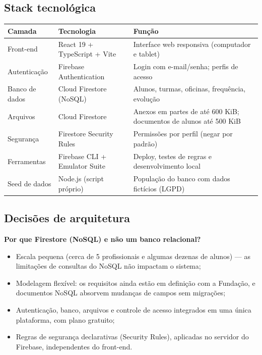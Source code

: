 \documentclass[a4paper,11pt]{article}
\begin{document}
\subsection{Stack tecnológica}

\begin{center}
\begin{tabularx}{\textwidth}{l l X}
\toprule
\textbf{Camada} & \textbf{Tecnologia} & \textbf{Função} \\
\midrule
Front-end & React 19 + TypeScript + Vite & Interface web responsiva (computador e tablet) \\
Autenticação & Firebase Authentication & Login com e-mail/senha; perfis de acesso \\
Banco de dados & Cloud Firestore (NoSQL) & Alunos, turmas, oficinas, frequência, evolução \\
Arquivos & Cloud Firestore & Anexos em partes de até 600 KiB; documentos de alunos até 500 KiB \\
Segurança & Firestore Security Rules & Permissões por perfil (negar por padrão) \\
Ferramentas & Firebase CLI + Emulator Suite & Deploy, testes de regras e desenvolvimento local \\
Seed de dados & Node.js (script próprio) & População do banco com dados fictícios (LGPD) \\
\bottomrule
\end{tabularx}
\end{center}

\subsection{Decisões de arquitetura}

\textbf{Por que Firestore (NoSQL) e não um banco relacional?}
\begin{itemize}[nosep]
  \item Escala pequena (cerca de 5 profissionais e algumas dezenas de alunos) --- as limitações de consultas do NoSQL não impactam o sistema;
  \item Modelagem flexível: os requisitos ainda estão em definição com a Fundação, e documentos NoSQL absorvem mudanças de campos sem migrações;
  \item Autenticação, banco, arquivos e controle de acesso integrados em uma única plataforma, com plano gratuito;
  \item Regras de segurança declarativas (Security Rules), aplicadas no servidor do Firebase, independentes do front-end.
\end{itemize}
\end{document}
